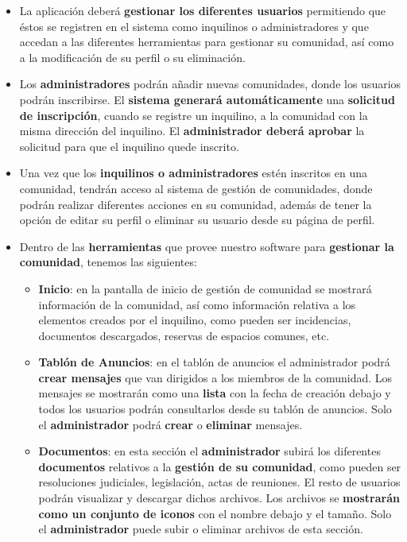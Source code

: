 \begin{itemize}
	\item La aplicación deberá \textbf{gestionar los diferentes usuarios} permitiendo que éstos se registren en el sistema como inquilinos o administradores y que accedan a las diferentes herramientas para gestionar su comunidad, así como a la modificación de su perfil o su eliminación.
	
 	\item Los \textbf{administradores} podrán añadir nuevas comunidades, donde los usuarios podrán inscribirse. El \textbf{sistema generará automáticamente} una \textbf{solicitud de inscripción}, cuando se registre un inquilino, a la comunidad con la misma dirección del inquilino. El \textbf{administrador deberá aprobar} la solicitud para que el inquilino quede inscrito.
 	
 	\item Una vez que los \textbf{inquilinos o administradores} estén inscritos en una comunidad, tendrán acceso al sistema de gestión de comunidades, donde podrán realizar diferentes acciones en su comunidad, además de tener la opción de editar su perfil o eliminar su usuario desde su página de perfil. 
 	
 	\item Dentro de las \textbf{herramientas} que provee nuestro software para \textbf{gestionar la comunidad}, tenemos las siguientes:
 	
 	\begin{itemize}
 		\item \textbf{Inicio}: en la pantalla de inicio de gestión de comunidad se mostrará información de la comunidad, así como información relativa a los elementos creados por el inquilino, como pueden ser incidencias, documentos descargados, reservas de espacios comunes, etc.
 		
 		\item \textbf{Tablón de Anuncios}: en el tablón de anuncios el administrador podrá \textbf{crear mensajes} que van dirigidos a los miembros de la comunidad. Los mensajes se mostrarán como una \textbf{lista} con la fecha de creación debajo y todos los usuarios podrán consultarlos desde su tablón de anuncios. Solo el \textbf{administrador} podrá \textbf{crear} o \textbf{eliminar} mensajes. 
 		
 		\item \textbf{Documentos}: en esta sección el \textbf{administrador} subirá los diferentes \textbf{documentos} relativos a la \textbf{gestión de su comunidad}, como pueden ser resoluciones judiciales, legislación, actas de reuniones. El resto de usuarios podrán visualizar y descargar dichos archivos. Los archivos se \textbf{mostrarán como un conjunto de iconos} con el nombre debajo y el tamaño. Solo el \textbf{administrador} puede subir o eliminar archivos de esta sección.
 		

\end{itemize}
\end{itemize}
